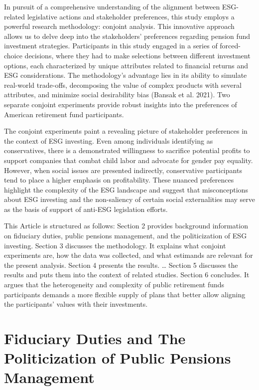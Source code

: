 \documentclass[
  12pt,
]{article}
\begin{document}
In pursuit of a comprehensive understanding of the alignment between ESG-related legislative actions and stakeholder preferences, this study employs a powerful research methodology: conjoint analysis. This innovative approach allows us to delve deep into the stakeholders' preferences regarding pension fund investment strategies. Participants in this study engaged in a series of forced-choice decisions, where they had to make selections between different investment options, each characterized by unique attributes related to financial returns and ESG considerations. The methodology's advantage lies in its ability to simulate real-world trade-offs, decomposing the value of complex products with several attributes, and minimize social desirability bias (Bansak et al. 2021). Two separate conjoint experiments provide robust insights into the preferences of American retirement fund participants.

The conjoint experiments paint a revealing picture of stakeholder preferences in the context of ESG investing. Even among individuals identifying as conservatives, there is a demonstrated willingness to sacrifice potential profits to support companies that combat child labor and advocate for gender pay equality. However, when social issues are presented indirectly, conservative participants tend to place a higher emphasis on profitability. These nuanced preferences highlight the complexity of the ESG landscape and suggest that misconceptions about ESG investing and the non-saliency of certain social externalities may serve as the basis of support of anti-ESG legislation efforts.

This Article is structured as follows: Section 2 provides background information on fiduciary duties, public pensions management, and the politicization of ESG investing. Section 3 discusses the methodology. It explains what conjoint experiments are, how the data was collected, and what estimands are relevant for the present analysis. Section 4 presents the results. \ldots{} Section 5 discusses the results and puts them into the context of related studies. Section 6 concludes. It argues that the heterogeneity and complexity of public retirement funds participants demands a more flexible supply of plans that better allow aligning the participants' values with their investments.

\hypertarget{fiduciary-duties-and-the-politicization-of-public-pensions-management}{%
\section{Fiduciary Duties and The Politicization of Public Pensions Management}\label{fiduciary-duties-and-the-politicization-of-public-pensions-management}}
\end{document}
